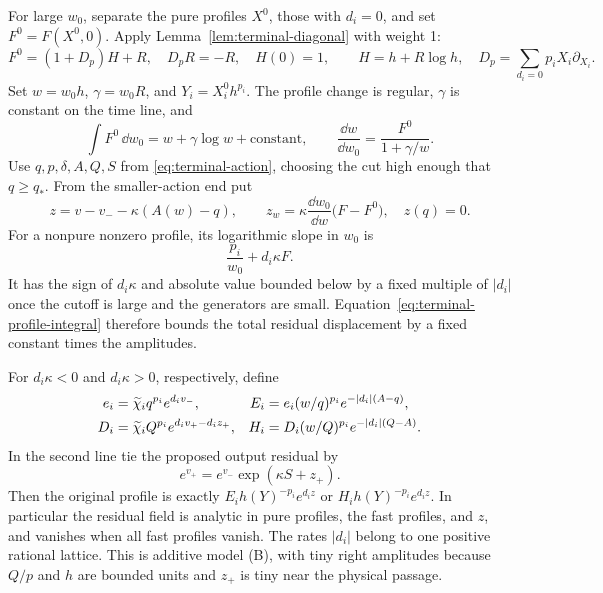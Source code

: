 For large \(w_0\), separate the pure profiles \(X^0\), those with
\(d_i=0\), and set \(F^0=F(X^0,0)\).  Apply
Lemma~\ref{lem:terminal-diagonal} with weight 1:
\begin{equation}\label{eq:terminal-annular-diagonal}
 F^0=(1+D_p)H+R,\quad D_pR=-R,\quad H(0)=1,
 \qquad H=h+R\log h,
 \quad D_p=\sum_{d_i=0}p_iX_i\partial_{X_i}.
\end{equation}
Set \(w=w_0h\), \(\gamma=w_0R\), and \(Y_i=X_i^0h^{p_i}\).
The profile change is regular, \(\gamma\) is constant on the time line,
and
\begin{equation}\label{eq:terminal-annular-primitive}
 \int F^0\,\dd w_0=w+\gamma\log w+\text{constant},\qquad
 \frac{\dd w}{\dd w_0}=\frac{F^0}{1+\gamma/w}.
\end{equation}
Use \(q,p,\delta,A,Q,S\) from \eqref{eq:terminal-action}, choosing the
cut high enough that \(q\ge q_*\).  From the smaller-action end put
\begin{equation}\label{eq:terminal-annular-residual}
 z=v-v_- -\kappa(A(w)-q),\qquad
 z_w=\kappa\frac{\dd w_0}{\dd w}\bigl(F-F^0\bigr),\quad z(q)=0.
\end{equation}
For a nonpure nonzero profile, its logarithmic slope in \(w_0\) is
\[
 \frac{p_i}{w_0}+d_i\kappa F.
\]
It has the sign of \(d_i\kappa\) and absolute value bounded below by a
fixed multiple of \(|d_i|\) once the cutoff is large and the generators
are small.  Equation~\eqref{eq:terminal-profile-integral} therefore bounds
the total residual displacement by a fixed constant times the amplitudes.

For \(d_i\kappa<0\) and \(d_i\kappa>0\), respectively, define
\begin{align}\label{eq:terminal-annular-amplitudes}
 e_i&=\widetilde\chi_iq^{p_i}e^{d_iv_-},&
 E_i&=e_i(w/q)^{p_i}e^{-|d_i|(A-q)},\notag\\
 D_i&=\widetilde\chi_iQ^{p_i}e^{d_iv_+-d_iz_+},&
 H_i&=D_i(w/Q)^{p_i}e^{-|d_i|(Q-A)}.
\end{align}
In the second line tie the proposed output residual by
\begin{equation}\label{eq:terminal-additive-end-tie}
 e^{v_+}=e^{v_-}\exp(\kappa S+z_+).
\end{equation}
Then the original profile is exactly \(E_i h(Y)^{-p_i}e^{d_i z}\) or
\(H_i h(Y)^{-p_i}e^{d_i z}\).  In particular the residual field is
analytic in pure profiles, the fast profiles, and \(z\), and vanishes
when all fast profiles vanish.  The rates \(|d_i|\) belong to one positive
rational lattice.  This is additive model (B), with tiny right amplitudes
because \(Q/p\) and \(h\) are bounded units and \(z_+\) is tiny near
the physical passage.

